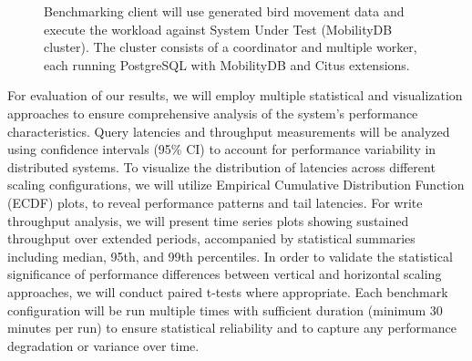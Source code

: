 \documentclass{article}
\begin{document}
\begin{figure}[ht]
    \caption{
	Benchmarking client will use generated bird movement data and execute
	the workload against System Under Test (MobilityDB cluster).
	The cluster consists of a coordinator and multiple worker, each running
	PostgreSQL with MobilityDB and Citus extensions. 
    }
    \label{fig:image}
\end{figure}

For evaluation of our results, we will employ multiple statistical and
visualization approaches to ensure comprehensive analysis of the system's
performance characteristics. 
%
Query latencies and throughput measurements will be analyzed using confidence
intervals (95\% CI) to account for performance variability in distributed
systems. 
%
To visualize the distribution of latencies across different scaling
configurations, we will utilize Empirical Cumulative Distribution Function
(ECDF) plots, to reveal performance patterns and tail latencies.
%
For write throughput analysis, we will present time series plots showing
sustained throughput over extended periods, accompanied by statistical summaries
including median, 95th, and 99th percentiles.
%
In order to validate the statistical significance of performance differences
between vertical and horizontal scaling approaches, we will conduct paired
t-tests where appropriate.
%
Each benchmark configuration will be run multiple times with sufficient duration
(minimum 30 minutes per run) to ensure statistical reliability and to capture
any performance degradation or variance over time.
\end{document}
